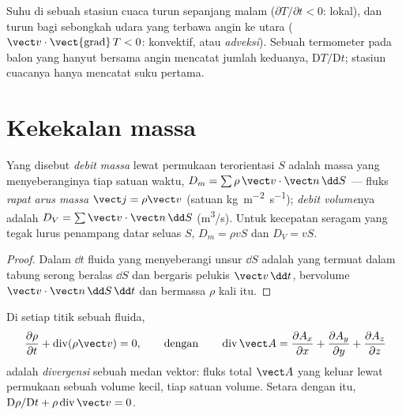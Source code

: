 \begin{example}\label{ex:b2:fluid-kinematics:weather}
Suhu di sebuah stasiun cuaca turun sepanjang malam ($\partial T/
\partial t < 0$: lokal), dan turun bagi sebongkah udara yang terbawa
angin ke utara ($\vect v\cdot\operatorname{\vect{grad}}T < 0$: konvektif,
atau \emph{adveksi}). Sebuah termometer pada balon yang hanyut bersama
angin mencatat jumlah keduanya, $\mathrm DT/\mathrm Dt$; stasiun cuacanya
hanya mencatat suku pertama.
\end{example}

\section{Kekekalan massa}

\begin{definition}\label{def:b2:fluid-kinematics:flowrate}
Yang disebut \emph{debit massa} lewat permukaan terorientasi $S$ adalah
massa yang menyeberanginya tiap satuan waktu, $D_m = \sum\rho\,\vect v\cdot\vect n\,\dd S$ ---
fluks \emph{rapat arus massa} $\vect j = \rho\vect v$ (satuan
\unit{kg.m^{-2}.s^{-1}}); \emph{debit volume}nya adalah $D_V = \sum\vect v
\cdot\vect n\,\dd S$ (\unit{m^3/s}). Untuk kecepatan seragam yang tegak lurus
penampang datar seluas $S$, $D_m = \rho vS$ dan $D_V = vS$.
\end{definition}

\begin{proof}
Dalam $\dd t$ fluida yang menyeberangi unsur $\dd S$ adalah yang termuat
dalam tabung serong beralas $\dd S$ dan bergaris pelukis $\vect v\,\dd t$,
bervolume $\vect v\cdot\vect n\,\dd S\,\dd t$ dan bermassa $\rho$ kali itu.
\end{proof}

\begin{theorem}\label{thm:b2:fluid-kinematics:continuity}
Di setiap titik sebuah fluida,
\[
\frac{\partial\rho}{\partial t} + \operatorname{div}(\rho\vect v) = 0 ,
\qquad\text{dengan}\qquad
\operatorname{div}\vect A = \frac{\partial A_x}{\partial x} + \frac{\partial A_y}{\partial y} +
\frac{\partial A_z}{\partial z}
\]
adalah \emph{divergensi} sebuah medan vektor: fluks total
$\vect A$ yang keluar lewat permukaan sebuah volume kecil, tiap satuan
volume. Setara dengan itu, $\mathrm D\rho/\mathrm Dt + \rho\operatorname{div}\vect v = 0$.
\end{theorem}

